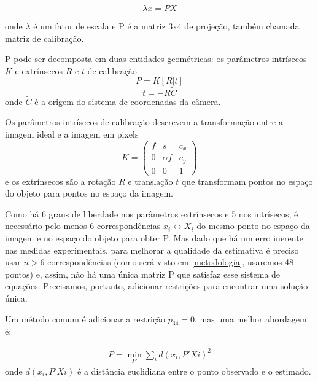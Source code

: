 \documentclass[conference]{IEEEtran}
\begin{document}
\begin{equation}\lambda  x = P  X\end{equation}

onde \(\lambda\) é um fator de escala e P é a matriz 3x4 de projeção, também chamada matriz de calibração.

P pode ser decomposta em duas entidades geométricas: os parâmetros intrísecos \(K\) e extrínsecos \(R\) e \(t\) de calibração\cite{tese}
\begin{equation}
P = K [R | t]
\end{equation}
\begin{equation}
t = -R\widetilde{C}
\end{equation}
onde \(\widetilde{C}\) é a origem do sistema de coordenadas da câmera\cite{Hartley2004}.

Os parâmetros intrísecos de calibração descrevem a transformação entre a imagem ideal e a imagem em pixels
\begin{equation}
K = \begin{pmatrix} 
f & s & c_x \\
0 & \alpha f & c_y\\
0 & 0 & 1
\end{pmatrix}
\end{equation}
e os extrínsecos são a rotação \(R\) e translação \(t\) que transformam pontos no espaço do objeto para pontos no espaço da imagem\cite{tese}.

Como há 6 graus de liberdade nos parâmetros extrínsecos e 5 nos intrísecos, é necessário pelo menos 6 correspondências \({x_i \leftrightarrow X_i}\) do mesmo ponto no espaço da imagem e no espaço do objeto para obter P\cite{tese}. Mas dado que há um erro inerente nas medidas experimentais, para melhorar a qualidade da estimativa é preciso usar \(n > 6\) correspondências (como será visto em \ref{metodologia}, usaremos 48 pontos) e, assim, não há uma única matriz P que satisfaz esse sistema de equações. Precisamos, portanto, adicionar restrições para encontrar uma solução única.  

Um método comum é adicionar a restrição \(p_{34} = 0\)\cite{Hartley2004}, mas uma melhor abordagem\cite{tese} é:

\begin{equation}
\begin{aligned}
P = \min_{P'} \sum_{i}d(x_i, P'Xi)^2
\end{aligned}
\end{equation}
onde \(d(x_i, P'Xi) \) é a distância euclidiana entre o ponto observado e o estimado. 
\end{document}
